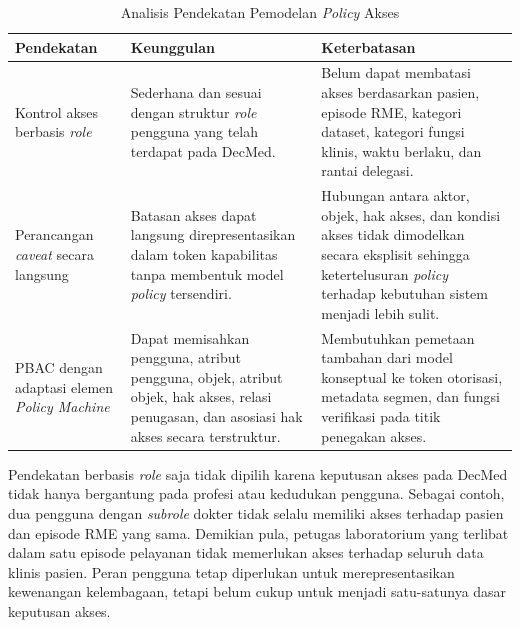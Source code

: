 \documentclass[bahasa, 12pt, a4paper, onecolumn, oneside, final]{report}
\begin{document}
\begin{table}[!ht]
	\centering
	\caption{Analisis Pendekatan Pemodelan \textit{Policy} Akses}
	\label{tab:analisis-pendekatan-model-kebijakan}
	\small
	\begin{tabular}{|p{}|p{}|p{}|}
		\hline
		\textbf{Pendekatan}
		 & \textbf{Keunggulan}
		 & \textbf{Keterbatasan}                                                                                                                                                               \\ \hline

		Kontrol akses berbasis \textit{role}
		 & Sederhana dan sesuai dengan struktur \textit{role} pengguna yang telah terdapat pada DecMed.
		 & Belum dapat membatasi akses berdasarkan pasien, episode RME, kategori dataset, kategori fungsi klinis, waktu berlaku, dan rantai delegasi.                                          \\ \hline

		Perancangan \textit{caveat} secara langsung
		 & Batasan akses dapat langsung direpresentasikan dalam token kapabilitas tanpa membentuk model \textit{policy} tersendiri.
		 & Hubungan antara aktor, objek, hak akses, dan kondisi akses tidak dimodelkan secara eksplisit sehingga ketertelusuran \textit{policy} terhadap kebutuhan sistem menjadi lebih sulit. \\ \hline

		PBAC dengan adaptasi elemen \textit{Policy Machine}
		 & Dapat memisahkan pengguna, atribut pengguna, objek, atribut objek, hak akses, relasi penugasan, dan asosiasi hak akses secara terstruktur.
		 & Membutuhkan pemetaan tambahan dari model konseptual ke token otorisasi, metadata segmen, dan fungsi verifikasi pada titik penegakan akses.                                          \\ \hline
	\end{tabular}

\end{table}

Pendekatan berbasis \textit{role} saja tidak dipilih karena keputusan akses pada DecMed tidak hanya bergantung pada profesi atau kedudukan pengguna. Sebagai contoh, dua pengguna dengan \textit{subrole} dokter tidak selalu memiliki akses terhadap pasien dan episode RME yang sama. Demikian pula, petugas laboratorium yang terlibat dalam satu episode pelayanan tidak memerlukan akses terhadap seluruh data klinis pasien. Peran pengguna tetap diperlukan untuk merepresentasikan kewenangan kelembagaan, tetapi belum cukup untuk menjadi satu-satunya dasar keputusan akses.
\end{document}

